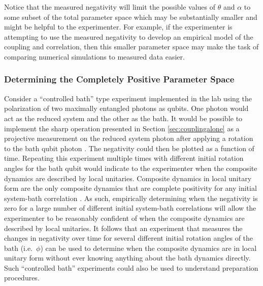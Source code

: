 Notice that the measured negativity will limit the possible values of $\theta$ and $\alpha$ to some subset of the total parameter space which may be substantially smaller and might be helpful to the experimenter.  For example, if the experimenter is attempting to use the measured negativity to develop an empirical model of the coupling and correlation, then this smaller parameter space may make the task of comparing numerical simulations to measured data easier.

\subsubsection{Determining the Completely Positive Parameter Space}

Consider a ``controlled bath'' type experiment implemented in the lab using the polarization of two maximally entangled photons as qubits.  One photon would act as the reduced system and the other as the bath.  It would be possible to implement the sharp operation presented in Section \ref{sec:couplingalone} as a projective measurement on the reduced system photon after applying a rotation to the bath qubit photon \cite{Ralph2010}.  The negativity could then be plotted as a function of time.  Repeating this experiment multiple times with different initial rotation angles for the bath qubit would indicate to the experimenter when the composite dynamics are described by local unitaries.  Composite dynamics in local unitary form are the only composite dynamics that are complete positivity for any initial system-bath correlation \cite{Hayashi2003}.  As such, empirically determining when the negativity is zero for a large number of different initial system-bath correlations will allow the experimenter to be reasonably confident of when the composite dynamics are described by local unitaries.  It follows that an experiment that measures the changes in negativity over time for several different initial rotation angles of the bath (i.e.\ $\phi$) can be used to determine when the composite dynamics are in local unitary form without ever knowing anything about the bath dynamics directly.  Such ``controlled bath'' experiments could also be used to understand preparation procedures.
 
